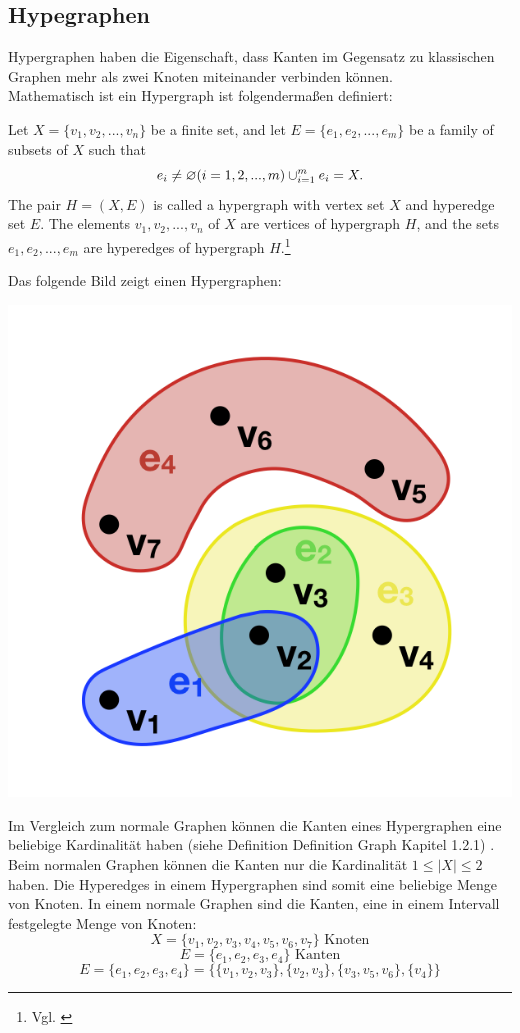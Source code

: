 \subsection{Hypegraphen}
Hypergraphen haben die Eigenschaft, dass Kanten im Gegensatz zu klassischen Graphen mehr als zwei Knoten miteinander verbinden können.
\\Mathematisch ist ein Hypergraph ist folgendermaßen definiert:
\begin{definition}
	Let $X=\{v_{1}, v_{2},...,v_{n}\}$ be a finite set,
	and let $E=\{e_{1},e_{2},...,e_{m}\}$ be a family of subsets of $X$ such that
	\[e_{i} \neq \varnothing (i=1,2,...,m) \\
	\cup_{i=1}^{m}e_{i}=X.
	\]
	The pair $H=(X,E)$ is called a hypergraph with vertex set $X$
	and hyperedge set $E$. The elements $v_{1}, v_{2},...,v_{n}$ of $X$ are vertices
	of hypergraph $H$, and the sets $e_{1}, e_{2},...,e_{m}$ are hyperedges of hypergraph $H$.\footnote{Vgl. \cite[Seite 2]{zhang2018hypergraph}}
\end{definition}
Das folgende Bild zeigt einen Hypergraphen:
\begin{center}
	\includegraphics[scale = 0.5]{./images/Hypergraph2.png}
\end{center}
Im Vergleich zum normale Graphen können die Kanten eines Hypergraphen eine beliebige Kardinalität haben (siehe Definition Definition Graph Kapitel 1.2.1) . Beim normalen Graphen können die Kanten nur die Kardinalität $1 \leq |X| \leq 2$
haben. Die Hyperedges in einem Hypergraphen sind somit eine beliebige Menge von Knoten. In einem normale Graphen sind die Kanten, eine in einem Intervall festgelegte Menge von Knoten:
    \[X = \{v_{1}, v_{2}, v_{3}, v_{4}, v_{5}, v_{6}, v_{7}\} \text{ Knoten}\]
    \[E=\{e_{1}, e_{2}, e_{3}, e_{4}\} \text{ Kanten}\]
    \[E=\{e_{1}, e_{2}, e_{3}, e_{4}\} = \{\{v_{1}, v_{2}, v_{3}\}, \{v_{2}, v_{3}\}, \{v_{3}, v_{5}, v_{6}\}, \{v_{4}\}\} \]
